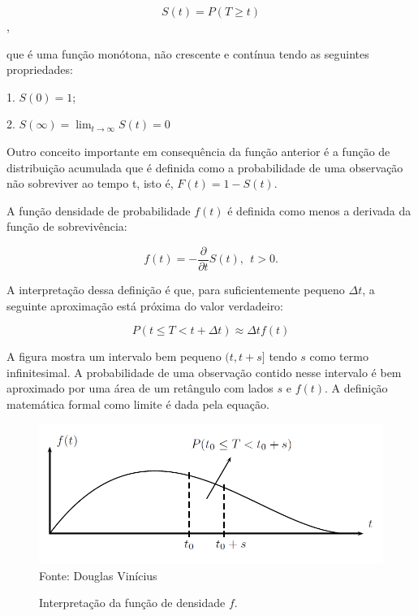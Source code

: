 \begin{equation}\label{eq:survival-function}
	S(t) = P(T \geq t)
\end{equation},

\noindent que é uma função monótona, não crescente e contínua tendo as seguintes propriedades:

1. $S(0) = 1$;

2. $S(\infty) = \displaystyle{\lim_{t \to \infty}}S(t) = 0$

Outro conceito importante em consequência da função anterior é a função de distribuição acumulada que é definida como a probabilidade de uma observação não sobreviver ao tempo t, isto é, $F(t) = 1-S(t)$.

A função densidade de probabilidade $f(t)$ é definida como menos a derivada da função de sobrevivência:

\begin{equation}\label{eq:density-function-survival}
	f(t) = -\dfrac{\partial}{\partial t}S(t), \ \ t > 0.
\end{equation}

A interpretação dessa definição é que, para suficientemente pequeno $\Delta t$, a seguinte aproximação está próxima do valor verdadeiro:

\begin{equation}\label{eq:aprox-function}
	P(t \leq T < t + \Delta t) \approx \Delta t f(t)
\end{equation}

A figura mostra um intervalo bem pequeno $(t,t+s]$ tendo $s$ como termo infinitesimal. A probabilidade de uma observação contido nesse intervalo é bem aproximado por uma área de um retângulo com lados $s$ e $f(t)$. A definição matemática formal como limite é dada pela equação.

\begin{figure}[h!]
	\centering
		\caption{Interpretação da função de densidade $f$.}
			\includegraphics[scale=0.45]{img/fig1} \\
		Fonte: Douglas Vinícius
	\label{fig:figura2}
\end{figure}

